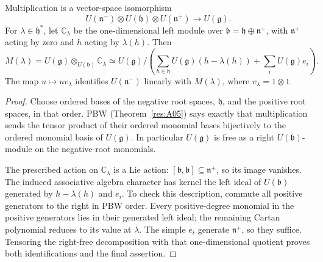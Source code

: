 \begin{proposition}
\label{res:G01}
Multiplication is a vector-space isomorphism
\[
 U(\mathfrak n^-)\otimes U(\mathfrak h)\otimes U(\mathfrak n^+)
 \longrightarrow U(\mathfrak g).
\]
For \(\lambda\in\mathfrak h^*\), let \(\mathbb C_\lambda\) be the
one-dimensional left module over
\(\mathfrak b=\mathfrak h\oplus\mathfrak n^+\), with \(\mathfrak n^+\)
acting by zero and \(h\) acting by \(\lambda(h)\). Then
\[
 M(\lambda)=U(\mathfrak g)\otimes_{U(\mathfrak b)}\mathbb C_\lambda
 \simeq U(\mathfrak g)/
 \left(\sum_{h\in\mathfrak h}U(\mathfrak g)(h-\lambda(h))
       +\sum_iU(\mathfrak g)e_i\right).
\]
The map \(u\mapsto uv_\lambda\) identifies \(U(\mathfrak n^-)\)
linearly with \(M(\lambda)\), where \(v_\lambda=1\otimes1\).
\end{proposition}
\begin{proof}
Choose ordered bases of the negative root spaces, \(\mathfrak h\),
and the positive root spaces, in that order. PBW
(Theorem~\ref{res:A05}) says exactly that multiplication sends the
tensor product of their ordered monomial bases bijectively to the
ordered monomial basis of \(U(\mathfrak g)\).
In particular \(U(\mathfrak g)\) is free as a right
\(U(\mathfrak b)\)-module on the negative-root monomials.

The prescribed action on \(\mathbb C_\lambda\) is a Lie action:
\([\mathfrak b,\mathfrak b]\subseteq\mathfrak n^+\), so its image
vanishes. The induced associative algebra character has kernel the
left ideal of \(U(\mathfrak b)\) generated by
\(h-\lambda(h)\) and \(e_i\). To check this description, commute all
positive generators to the right in PBW order. Every positive-degree
monomial in the positive generators lies in their generated left ideal;
the remaining Cartan polynomial reduces to its value at \(\lambda\).
The simple \(e_i\) generate \(\mathfrak n^+\), so they suffice.
Tensoring the right-free decomposition with that one-dimensional
quotient proves both identifications and the final assertion.
\end{proof}

